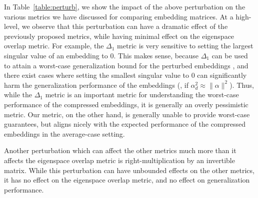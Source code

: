 In Table~\ref{table:perturb}, we show the impact of the above perturbation on the various metrics we have discussed for comparing embedding matrices.
At a high-level, we observe that this perturbation can have a dramatic effect of the previously proposed metrics, while having minimal effect on the eigenspace overlap metric.
For example, the $\Delta_1$ metric is very sensitive to setting the largest singular value of an embedding to 0.
This makes sense, because $\Delta_1$ can be used to attain a worst-case generalization bound for the perturbed embeddings \citep{lprff18}, and there exist cases where setting the smallest singular value to 0 can significantly harm the generalization performance of the embeddings (\eg, if $\alpha_d^2 \approx \|\alpha\|^2$).
Thus, while the $\Delta_1$ metric is an important metric for understanding the worst-case performance of the compressed embeddings, it is generally an overly pessimistic metric.
Our metric, on the other hand, is generally unable to provide worst-case guarantees, but aligns nicely with the expected performance of the compressed embeddings in the average-case setting.

Another perturbation which can affect the other metrics much more than it affects the eigenspace overlap metric is right-multiplication by an invertible matrix.
While this perturbation can have unbounded effects on the other metrics, it has no effect on the eigenspace overlap metric, and no effect on generalization performance.

